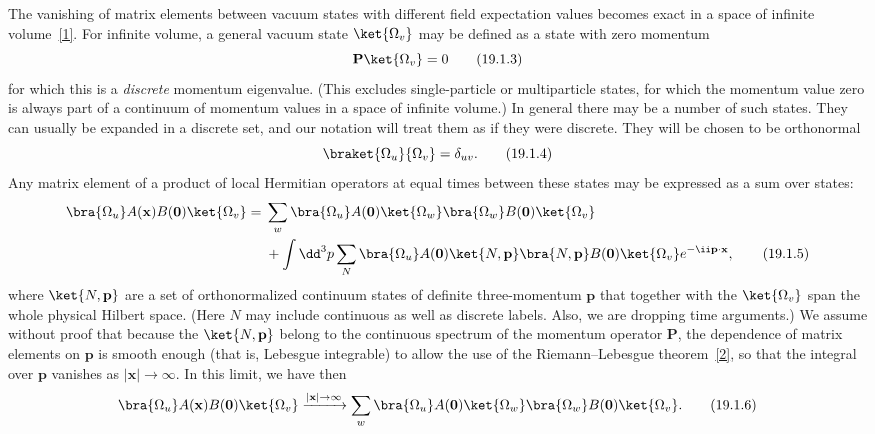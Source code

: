 The vanishing of matrix elements between vacuum states with different field
expectation values becomes exact in a space of infinite
volume~\hyperref[ch19-ref-1]{[1]}. For infinite volume, a general vacuum state
$\ket{\Omega_v}$ may be defined as a state with zero momentum
\begin{equation}
 \mathbf P\ket{\Omega_v}=0
 \tag{19.1.3}\label{eq:19.1.3}
\end{equation}
for which this is a \emph{discrete} momentum eigenvalue. (This excludes
single-particle or multiparticle states, for which the momentum value zero is
always part of a continuum of momentum values in a space of infinite
volume.) In general there may be a number of such states. They can usually be
expanded in a discrete set, and our notation will treat them as if they were
discrete. They will be chosen to be orthonormal
\begin{equation}
 \braket{\Omega_u}{\Omega_v}=\delta_{uv}.
 \tag{19.1.4}\label{eq:19.1.4}
\end{equation}
Any matrix element of a product of local Hermitian operators at equal times
between these states may be expressed as a sum over states:
\begin{align}
 \bra{\Omega_u}A(\mathbf x)B(\mathbf 0)\ket{\Omega_v}
 ={}&\sum_w
 \bra{\Omega_u}A(\mathbf 0)\ket{\Omega_w}
 \bra{\Omega_w}B(\mathbf 0)\ket{\Omega_v}
 \notag\\
 &+\int \dd^3p\sum_N
 \bra{\Omega_u}A(\mathbf 0)\ket{N,\mathbf p}
 \bra{N,\mathbf p}B(\mathbf 0)\ket{\Omega_v}
 e^{-\ii\mathbf p\cdot\mathbf x},
 \tag{19.1.5}\label{eq:19.1.5}
\end{align}
where $\ket{N,\mathbf p}$ are a set of orthonormalized continuum states of
definite three-momentum $\mathbf p$ that together with the
$\ket{\Omega_v}$ span the whole physical Hilbert space. (Here $N$ may include
continuous as well as discrete labels. Also, we are dropping time
arguments.) We assume without proof that because the $\ket{N,\mathbf p}$
belong to the continuous spectrum of the momentum operator $\mathbf P$, the
dependence of matrix elements on $\mathbf p$ is smooth enough (that is,
Lebesgue integrable) to allow the use of the Riemann--Lebesgue
theorem~\hyperref[ch19-ref-2]{[2]}, so that the integral over $\mathbf p$
vanishes as $\lvert\mathbf x\rvert\to\infty$. In this limit, we have then
\begin{equation}
 \bra{\Omega_u}A(\mathbf x)B(\mathbf 0)\ket{\Omega_v}
 \xrightarrow{\lvert\mathbf x\rvert\to\infty}
 \sum_w\bra{\Omega_u}A(\mathbf 0)\ket{\Omega_w}
 \bra{\Omega_w}B(\mathbf 0)\ket{\Omega_v}.
 \tag{19.1.6}\label{eq:19.1.6}
\end{equation}
